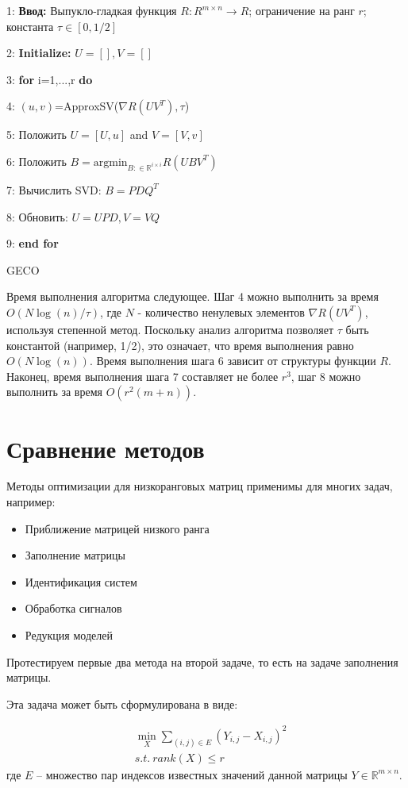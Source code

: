 \documentclass[oneside,final,14pt]{extreport} %
\begin{document}
\begin{algorithm}

1: \textbf{Ввод:} Выпукло-гладкая функция $R : R^{m \times n} \rightarrow R$; ограничение на ранг $r$; константа $\tau \in [0, 1/2]$

2: \textbf{Initialize:} $U = [], V = []$

3: \textbf{for} i=1,...,r \textbf{do}

4: $(u,v)$=ApproxSV($\nabla R(UV^T),\tau$)

5: \quad Положить $U = [U,u]$ and $V = [V,v]$

6: \quad Положить $B = \text{argmin}_{B : \in \mathbb R^{i \times i}} R(UBV^T)$

7: \quad Вычислить SVD: $B = PDQ^T$

8: \quad Обновить: $U=UPD,V=VQ$

9: \textbf{end for}
\caption{GECO}
\end{algorithm}


Время выполнения алгоритма следующее. Шаг 4 можно выполнить за время $ O (N \log (n) / \tau) $, где $ N $ - количество ненулевых элементов $ \nabla R (UV^T) $, используя степенной метод. Поскольку анализ алгоритма позволяет $ \tau $ быть константой (например, 1/2), это означает, что время выполнения равно $ O (N \log (n)) $. Время выполнения шага 6 зависит от структуры функции $ R $. Наконец, время выполнения шага 7 составляет не более $ r^3 $, шаг 8 можно выполнить за время $ O (r^2 (m + n)) $.

\chapter{Сравнение методов}

Методы оптимизации для низкоранговых матриц применимы для многих задач, например:
\begin{itemize}
  \item Приближение матрицей низкого ранга
  \item Заполнение матрицы
  \item Идентификация систем
  \item Обработка сигналов
  \item Редукция моделей
\end{itemize}

Протестируем первые два метода на второй задаче, то есть на задаче заполнения матрицы.

Эта задача может быть сформулирована в виде:

\begin{equation}
	\begin{aligned}
		&\min_X \sum_{(i,j) \in E} (Y_{i,j} - X_{i, j})^2 \\ &s.t. \ rank(X) \le r
	\end{aligned}
\end{equation}
где $E$ -- множество пар индексов известных значений данной матрицы $Y \in \mathbb{R}^{m \times n}$.
\end{document}
